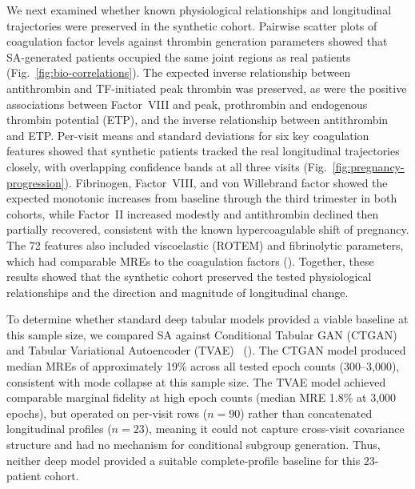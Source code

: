 We next examined whether known physiological relationships and longitudinal
trajectories were preserved in the synthetic cohort. Pairwise scatter plots of
coagulation factor levels against thrombin generation parameters showed that
SA-generated patients occupied the same joint regions as real patients
(Fig.~\ref{fig:bio-correlations}). The expected inverse relationship between
antithrombin and TF-initiated peak thrombin was preserved, as were the positive
associations between Factor~VIII and peak, prothrombin and endogenous thrombin
potential (ETP), and the inverse relationship between antithrombin and ETP.
Per-visit means and standard deviations for six key coagulation features showed
that synthetic patients tracked the real longitudinal trajectories closely, with
overlapping confidence bands at all three visits
(Fig.~\ref{fig:pregnancy-progression}). Fibrinogen, Factor~VIII, and von Willebrand
factor showed the expected monotonic increases from baseline through the third
trimester in both cohorts, while Factor~II increased modestly and antithrombin
declined then partially recovered, consistent with the known hypercoagulable shift
of pregnancy. The 72 features also included viscoelastic (ROTEM) and fibrinolytic
parameters, which had comparable MREs to the coagulation factors
().  Together, these results
showed that the synthetic cohort preserved the tested physiological relationships and
the direction and magnitude of longitudinal change.

To determine whether standard deep tabular models provided a viable baseline at this sample
size, we compared SA against Conditional Tabular GAN (CTGAN) and Tabular Variational Autoencoder
(TVAE)~\citep{Xu2019CTGAN} (). The CTGAN model produced median
MREs of approximately 19\% across all tested epoch counts (300--3,000), consistent with
mode collapse at this sample size. The TVAE model achieved comparable marginal fidelity at
high epoch counts (median MRE
1.8\% at 3,000 epochs), but operated on per-visit rows ($n{=}90$) rather than
concatenated longitudinal profiles ($n{=}23$), meaning it could not capture cross-visit
covariance structure and had no mechanism for conditional subgroup generation. Thus, neither
deep model provided a suitable complete-profile baseline for this $23$-patient cohort.

